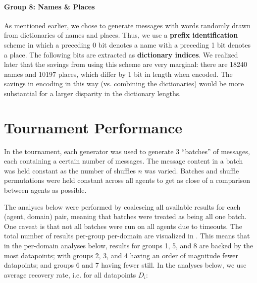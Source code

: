 \documentclass[titlepage]{article}
\begin{document}
\paragraph{Group 8: Names \& Places} As mentioned earlier, we chose to generate messages with words randomly drawn from dictionaries of names and places. Thus, we use a \textbf{prefix identification} scheme in which a preceding 0 bit denotes a name with a preceding 1 bit denotes a place. The following bits are extracted as \textbf{dictionary indices}. We realized later that the savings from using this scheme are very marginal: there are 18240 names and 10197 places, which differ by 1 bit in length when encoded. The savings in encoding in this way (vs. combining the dictionaries) would be more substantial for a larger disparity in the dictionary lengths.

\section{Tournament Performance}
In the tournament, each generator was used to generate 3 ``batches'' of messages, each containing a certain number of messages. The message content in a batch was held constant as the number of shuffles $n$ was varied. Batches and shuffle permutations were held constant across all agents to get as close of a comparison between agents as possible.

The analyses below were performed by coalescing all available results for each (agent, domain) pair, meaning that batches were treated as being all one batch. One caveat is that not all batches were run on all agents due to timeouts. The total number of results per-group per-domain are visualized in . This means that in the per-domain analyses below, results for groups 1, 5, and 8 are backed by the most datapoints; with groups 2, 3, and 4 having an order of magnitude fewer datapoints; and groups 6 and 7 having fewer still. In the analyses below, we use average recovery rate, i.e. for all datapoints $D_i$:
\end{document}
